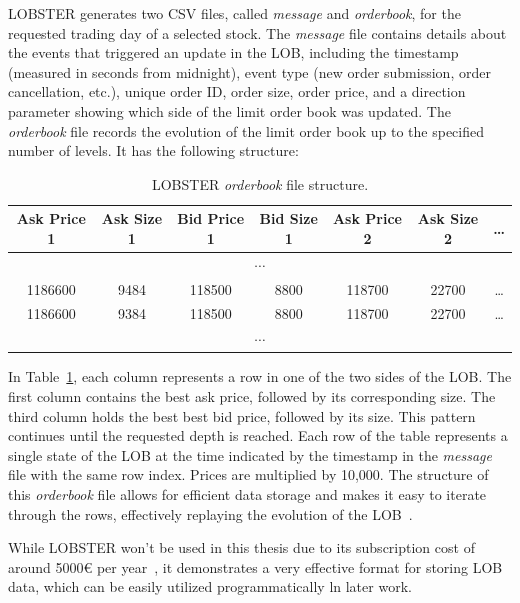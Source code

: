 \documentclass[a4paper,oneside,onecolumn,12pt]{book}
\begin{document}
	LOBSTER generates two CSV files, called \textit{message} and \textit{orderbook}, for the requested trading day of a selected stock. The \textit{message} file contains details about the events that triggered an update in the LOB, including the timestamp (measured in seconds from midnight), event type (new order submission, order cancellation, etc.), unique order ID, order size, order price, and a direction parameter showing which side of the limit order book was updated. The \textit{orderbook} file records the evolution of the limit order book up to the specified number of levels. It has the following structure: 
	\begin{table}[H]
		\begin{center}
		\begin{tabular}{|c|c|c|c|c|c|c|}
			\hline
			\textbf{Ask Price 1} & \textbf{Ask Size 1} & \textbf{Bid Price 1} & \textbf{Bid Size 1} & \textbf{Ask Price 2} & \textbf{Ask Size 2} & \textbf{\dots} \\
			\hline
			\multicolumn{7}{|c|}{$\cdots$} \\
			\hline
			1186600 & 9484  & 118500 & 8800  & 118700  & 22700  & \dots \\ 
			\hline
			1186600 & 9384  & 118500 & 8800  & 118700  & 22700  & \dots \\ 
			\hline
			\multicolumn{7}{|c|}{$\cdots$} \\
			\hline
		\end{tabular}
		\end{center}
		\caption{LOBSTER \textit{orderbook} file structure.}
		\label{table:lobster}
	\end{table}
	In Table~\ref{table:lobster}, each column represents a row in one of the two sides of the LOB. The first column contains the best ask price, followed by its corresponding size. The third column holds the best best bid price, followed by its size. This pattern continues until the requested depth is reached. Each row of the table represents a single state of the LOB at the time indicated by the timestamp in the \textit{message} file with the same row index. Prices are multiplied by 10,000. The structure of this \textit{orderbook} file allows for efficient data storage and makes it easy to iterate through the rows, effectively replaying the evolution of the LOB~\cite{LOBSTERDS}.

	While LOBSTER won't be used in this thesis due to its subscription cost of around 5000€ per year~\cite{LOBSTERAO}, it demonstrates a very effective format for storing LOB data, which can be easily utilized programmatically ln later work.
\end{document}
